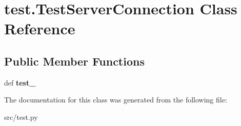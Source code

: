 \hypertarget{classtest_1_1_test_server_connection}{\section{test.\-Test\-Server\-Connection \-Class \-Reference}
\label{classtest_1_1_test_server_connection}
}
\subsection*{\-Public \-Member \-Functions}
\begin{DoxyCompactItemize}
\item 
\hypertarget{classtest_1_1_test_server_connection_ac62e9eb7418ae13d1ba768da3f490d63}{def {\bfseries test\-\_\-}}\label{classtest_1_1_test_server_connection_ac62e9eb7418ae13d1ba768da3f490d63}

\end{DoxyCompactItemize}


\-The documentation for this class was generated from the following file\-:\begin{DoxyCompactItemize}
\item 
src/test.\-py\end{DoxyCompactItemize}
